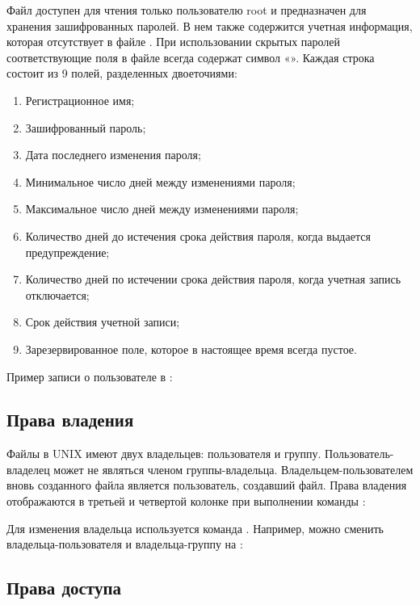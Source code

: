 Файл  доступен для чтения только пользователю root и предназначен для хранения зашифрованных паролей. В нем также содержится учетная информация, которая отсутствует в файле . При использовании скрытых паролей соответствующие поля в файле  всегда содержат символ «». Каждая строка состоит из 9 полей, разделенных двоеточиями:
\begin{enumerate}
	\item Регистрационное имя;
	\item Зашифрованный пароль;
	\item Дата последнего изменения пароля;
	\item Минимальное число дней между изменениями пароля;
	\item Максимальное число дней между изменениями пароля;
	\item Количество дней до истечения срока действия пароля, когда выдается предупреждение;
	\item Количество дней по истечении срока действия пароля, когда учетная запись отключается;
	\item Срок действия учетной записи;
	\item Зарезервированное поле, которое в настоящее время всегда пустое.
\end{enumerate}

Пример записи о пользователе в :


\subsection{Права владения}

Файлы в UNIX имеют двух владельцев: пользователя и группу. Пользователь-владелец может не являться членом группы-владельца. Владельцем-пользователем вновь созданного файла является пользователь, создавший файл. Права владения отображаются в третьей и четвертой колонке при выполнении команды :


Для изменения владельца используется команда . Например, можно сменить владельца-пользователя и владельца-группу на :


\subsection{Права доступа}

